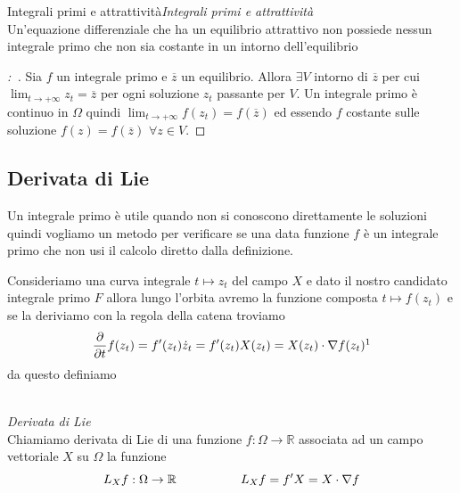 \documentclass[11pt,a4paper,twoside]{book}
\newenvironment{proposizione}[1][\empty]{\begin{Proposizione}{
\ifx\empty#1\relax\else\mdseries\itshape#1\\\fi
}{}}{\end{Proposizione}}
\newenvironment{definizione}[1][\empty]{\begin{Definizione}{
\ifx\empty#1\relax\else\mdseries\itshape#1\\\fi
}{}}{\end{Definizione}}
\newenvironment{dimo}[1][\proofname]{
	\begin{tcolorbox}[
	breakable, 
	enhanced, 
	interior hidden, 
	frame hidden, 
	borderline west = {1pt}{0pt}{gray}, 
	top=0pt, bottom=0pt, left=0pt]
\begin{proof}[#1:~]
}
{
\end{proof}
\end{tcolorbox}
}
\theoremstyle{esss}
\theoremstyle{dotless}
\numberwithin{equation}{section} %
\begin{document}
\begin{proposizione}[Integrali primi e attrattività]\label{propIntegraliPrimiAttattività}
Un'equazione differenziale che ha un equilibrio attrattivo non possiede nessun integrale primo che non sia costante in un intorno dell'equilibrio
\end{proposizione}
\begin{dimo}
Sia $f$ un integrale primo e $\overline{z}$ un equilibrio. Allora $\exists V$ intorno di $\overline{z}$ per cui $\lim_{t\rightarrow +\infty}z_t=\overline{z}$ per ogni soluzione $z_t$ passante per $V$. Un integrale primo è continuo in $\Omega$ quindi $\lim_{t\rightarrow +\infty}f(z_t)=f(\overline{z})$ ed essendo $f$ costante sulle soluzione $f(z)=f(\overline{z})$ $\forall z\in V$. \qedhere
\end{dimo}

\subsection{Derivata di Lie}

Un integrale primo è utile quando non si conoscono direttamente le soluzioni quindi vogliamo un metodo per verificare se una data funzione $f$ è un integrale primo che non usi il calcolo diretto dalla definizione.

Consideriamo una curva integrale $t\mapsto z_t$ del campo $X$ e dato il nostro candidato integrale primo $F$ allora lungo l'orbita avremo la funzione composta $t\mapsto f(z_t)$ e se la deriviamo con la regola della catena troviamo
\[
\dfrac{\partial}{\partial t}f(z_t)=f'(z_t)\dot{z}_t=f'(z_t)X(z_t)=X(z_t)\cdot\nabla f(z_t)\footnotemark
\]
da questo definiamo
\begin{definizione}\textit{Derivata di Lie}\\
Chiamiamo derivata di Lie di una funzione $f:\Omega\rightarrow\mathbb{R}$ associata ad un campo vettoriale $X$ su $\Omega$ la funzione
\[
L_Xf:\Omega\rightarrow\mathbb{R} \hspace{0.15\linewidth}
L_Xf=f'X=X\cdot\nabla f
\]
\end{definizione}
\end{document}
